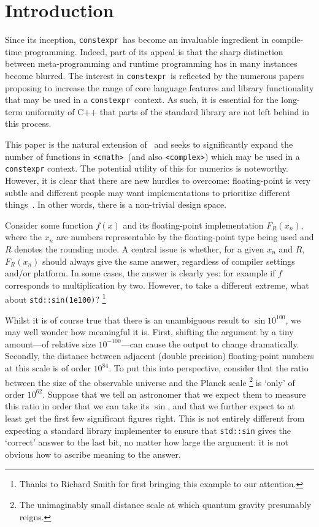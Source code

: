\documentclass[prd,twocolumn,amsmath,amssymb,nofootinbib,eqsecnum]{revtex4-1}
\newcommand{\constexpr}{\code{constexpr}\xspace}
\newcommand{\code}[1]{{\tt #1}}
\newcommand{\header}[1]{{\tt <#1>}}
\newcommand{\cmath}{\header{cmath}}
\newcommand{\complex}{\header{complex}}
\begin{document}
\section{Introduction}
\label{sec:Intro}

Since its inception, \constexpr\ has become an invaluable ingredient in compile-time programming. Indeed, part of its appeal is that the sharp distinction between meta-programming and runtime programming has in many instances become blurred. The interest in \constexpr\ is reflected by the numerous papers proposing to increase the range of core language features and library functionality that may be used in a \constexpr\ context. As such, it is essential for the long-term uniformity of C++ that parts of the standard library are not left behind in this process.

This paper is the natural extension of~\cite{Rosten-constexpr} and seeks to significantly expand the number of functions in \cmath\ (and also \complex) which may be used in a \constexpr context. The potential utility of this for numerics is noteworthy. However, it is clear that there are new hurdles to overcome: floating-point is very subtle and different people may want implementations to prioritize different things~\cite{Timmons-Less}. In other words, there is a non-trivial design space. 

Consider some function $f(x)$ and its floating-point implementation $F_R(x_n)$, where the $x_n$ are numbers representable by the floating-point type being used and $R$ denotes the rounding mode. A central issue is whether, for a given $x_n$ and $R$, $F_R(x_n)$ should always give the same answer, regardless of compiler settings and/or platform. In some cases, the answer is clearly yes: for example if $f$ corresponds to multiplication by two.  However, to take a different extreme, what about \code{std::sin(1e100)}?%
\footnote{Thanks to Richard Smith for first bringing this example to our attention.}

Whilst it is of course true that there is an unambiguous result to $\sin 10^{100}$, we may well wonder how meaningful it is. First, shifting the argument by a tiny amount---of relative size $10^{-100}$---can cause the output to change dramatically. Secondly, the distance between adjacent (double precision) floating-point numbers at this scale is of order $10^{84}$. To put this into perspective, consider that the ratio between the size of the observable universe and the Planck scale%
\footnote{The unimaginably small distance scale at which quantum gravity presumably reigns.}
is `only' of order $10^{62}$. Suppose that we tell an astronomer that we expect them to measure this ratio in order that we can take its $\sin$, and that we further expect to at least get the first few significant figures right. This is not entirely different from expecting a standard library implementer to ensure that \code{std::sin} gives the `correct' answer to the last bit, no matter how large the argument: it is not obvious how to ascribe meaning to the answer.
\end{document}
